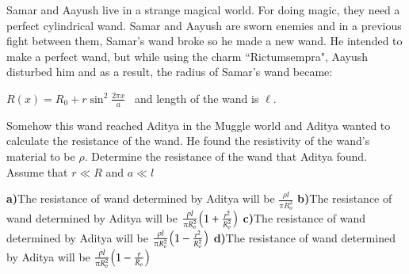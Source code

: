 \documentclass[11pt,a4paper]{scrartcl}
\begin{document}
\begin{problem}

Samar and Aayush live in a strange magical world. For doing magic, they need a perfect cylindrical wand. Samar and Aayush are sworn enemies and in a previous fight between them, Samar's wand broke so he made a new wand. He intended to make a perfect wand, but while using the charm ``Rictumsempra", Aayush disturbed him and as a result, the radius of Samar's wand became:

$R(x)=R_0+r\sin^2 \frac{2 \pi x}{a}$ \ and length of the wand is $\ell$.

Somehow this wand reached Aditya in the Muggle world and Aditya wanted to calculate the resistance of the wand. He found the resistivity of the wand's material to be $\rho$. Determine the resistance of the wand that Aditya found. 
Assume that $r\ll R$ and $a\ll l$
\vspace{5mm}

\textbf{a)}The resistance of wand determined by Aditya will be $\frac{\rho l}{\pi R_o^2}$ \newline 
\textbf{b)}The resistance of wand determined by Aditya will be $\frac{\rho l}{\pi R_o^2}\qty(1+\frac{r^2}{R_o^2})$ 
\newline \textbf{c)}The resistance of wand determined by Aditya will be $\frac{\rho l}{\pi R_o^2}\qty(1-\frac{r^2}{R_o^2})$ 
\newline \textbf{d)}The resistance of wand determined by Aditya will be $\frac{\rho l}{\pi R_o^2}\qty(1-\frac{r}{R_o})$
\vspace{10mm}
\begin{center}
    


\begin{tikzpicture}[x=0.75pt,y=0.75pt,yscale=-1,xscale=1]


\end{tikzpicture}
\end{center}
\end{problem}
\end{document}
